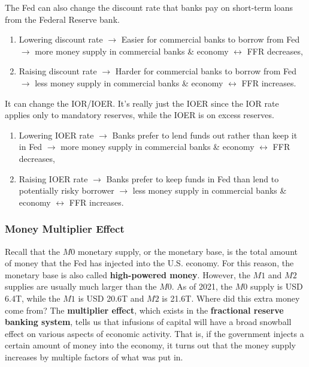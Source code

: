 \documentclass{article}
\begin{document}
    \begin{definition}
      The Fed can also change the discount rate that banks pay on short-term loans from the Federal Reserve bank.
      \begin{enumerate}
        \item Lowering discount rate $\rightarrow$ Easier for commercial banks to borrow from Fed $\rightarrow$ more money supply in commercial banks \& economy $\leftrightarrow$ FFR decreases,
        \item Raising discount rate $\rightarrow$ Harder for commercial banks to borrow from Fed $\rightarrow$ less money supply in commercial banks \& economy $\leftrightarrow$ FFR increases.
      \end{enumerate}
    \end{definition}

    \begin{definition}
      It can change the IOR/IOER. It's really just the IOER since the IOR rate applies only to mandatory reserves, while the IOER is on excess reserves.
      \begin{enumerate}
        \item Lowering IOER rate $\rightarrow$ Banks prefer to lend funds out rather than keep it in Fed $\rightarrow$ more money supply in commercial banks \& economy $\leftrightarrow$ FFR decreases,
        \item Raising IOER rate $\rightarrow$ Banks prefer to keep funds in Fed than lend to potentially risky borrower $\rightarrow$ less money supply in commercial banks \& economy $\leftrightarrow$ FFR increases.
      \end{enumerate}
    \end{definition}

    \subsubsection{Money Multiplier Effect}

      Recall that the $M0$ monetary supply, or the monetary base, is the total amount of money that the Fed has injected into the U.S. economy. For this reason, the monetary base is also called \textbf{high-powered money}. However, the $M1$ and $M2$ supplies are usually much larger than the $M0$. As of 2021, the $M0$ supply is USD 6.4T, while the $M1$ is USD 20.6T and $M2$ is 21.6T. Where did this extra money come from? The \textbf{multiplier effect}, which exists in the \textbf{fractional reserve banking system}, tells us that infusions of capital will have a broad snowball effect on various aspects of economic activity. That is, if the government injects a certain amount of money into the economy, it turns out that the money supply increases by multiple factors of what was put in.
\end{document}
